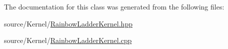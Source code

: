 The documentation for this class was generated from the following files\-:\begin{DoxyCompactItemize}
\item 
source/\-Kernel/\hyperlink{_rainbow_ladder_kernel_8hpp}{Rainbow\-Ladder\-Kernel.\-hpp}\item 
source/\-Kernel/\hyperlink{_rainbow_ladder_kernel_8cpp}{Rainbow\-Ladder\-Kernel.\-cpp}\end{DoxyCompactItemize}
